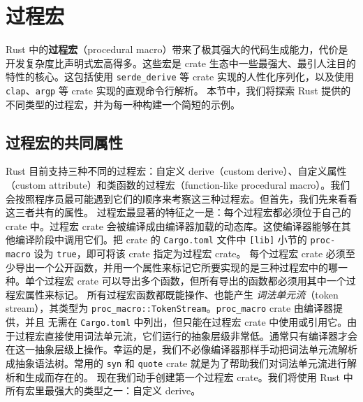 \section{过程宏}
\label{idx:idx_0003805b}
Rust 中的\textbf{过程宏}（procedural macro）带来了极其强大的代码生成能力，代价是开发复杂度比声明式宏高得多。这些宏是 crate 生态中一些最强大、最引人注目的特性的核心。这包括使用 \texttt{serde\_\allowbreak{}derive} 等 crate 实现的人性化序列化，以及使用 \texttt{clap}、\texttt{argp} 等 crate 实现的直观命令行解析。
本节中，我们将探索 Rust 提供的不同类型的过程宏，并为每一种构建一个简短的示例。
\subsection{过程宏的共同属性}
\label{idx:idx_e66baaeb}
Rust 目前支持三种不同的过程宏：自定义 derive（custom derive）、自定义属性（custom attribute）和类函数的过程宏（function-\allowbreak{}like procedural macro）。我们会按照程序员最可能遇到它们的顺序来考察这三种过程宏。但首先，我们先来看看这三者共有的属性。
过程宏最显著的特征之一是：每个过程宏都必须位于自己的 crate 中。过程宏 crate 会被编译成由编译器加载的动态库。这使编译器能够在其他编译阶段中调用它们。把 crate 的 \texttt{Cargo.toml} 文件中 \texttt{[lib]} 小节的 \texttt{proc-macro} 设为 \texttt{true}，即可将该 crate 指定为过程宏 crate。
每个过程宏 crate 必须至少导出一个公开函数，并用一个属性来标记它所要实现的是三种过程宏中的哪一种。单个过程宏 crate 可以导出多个函数，但所有导出的函数都必须用其中一个过程宏属性来标记。
所有过程宏函数都既能操作、也能产生 \emph{词法单元流}（token stream），其类型为
\texttt{proc\_\allowbreak{}macro::\allowbreak{}TokenStream}。\texttt{proc\_macro} crate 由编译器提供，并且
\label{idx:idx_9388baa5}
无需在 \texttt{Cargo.toml} 中列出，但只能在过程宏 crate 中使用或引用它。由于过程宏直接使用词法单元流，它们运行的抽象层级非常低。通常只有编译器才会在这一抽象层级上操作。幸运的是，我们不必像编译器那样手动把词法单元流解析成抽象语法树。常用的 \texttt{syn} 和 \texttt{quote} crate 就是为了帮助我们对词法单元流进行解析和生成而存在的。
现在我们动手创建第一个过程宏 crate。我们将使用 Rust 中所有宏里最强大的类型之一：自定义 derive。
